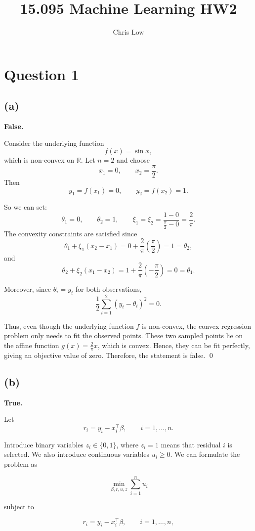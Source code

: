 \documentclass{article}
\title{15.095 Machine Learning HW2}
\author{Chris Low}
\date{} %
\begin{document}
\maketitle

\section*{Question 1}

\subsection*{(a)}
\textbf{False.}

Consider the underlying function
\[
f(x) = \sin x,
\]
which is non-convex on $\mathbb{R}$. Let $n=2$ and choose
\[
x_1 = 0, \qquad x_2 = \frac{\pi}{2}.
\]
Then
\[
y_1 = f(x_1) = 0, \qquad y_2 = f(x_2) = 1.
\]

So we can set: 
\[
\theta_1 = 0, \qquad \theta_2 = 1,
\qquad
\xi_1 = \xi_2 = \frac{1-0}{\frac{\pi}{2}-0} = \frac{2}{\pi}.
\]
The convexity constraints are satisfied since
\[
\theta_1 + \xi_1(x_2-x_1)
= 0 + \frac{2}{\pi}\left(\frac{\pi}{2}\right)
= 1
= \theta_2,
\]
and
\[
\theta_2 + \xi_2(x_1-x_2)
= 1 + \frac{2}{\pi}\left(-\frac{\pi}{2}\right)
= 0
= \theta_1.
\]

Moreover, since $\theta_i = y_i$ for both observations,
\[
\frac{1}{2}\sum_{i=1}^2 (y_i-\theta_i)^2 = 0.
\]

Thus, even though the underlying function $f$ is non-convex, the convex
regression problem only needs to fit the observed points. These two
sampled points lie on the affine function $g(x)=\frac{2}{\pi}x$, which
is convex. Hence, they can be fit perfectly, giving an objective value
of zero. Therefore, the statement is false. \qed

\newpage
\subsection*{(b)}
\textbf{True.}

Let
\[
r_i = y_i - x_i^\top \beta, \qquad i=1,\ldots,n.
\]

Introduce binary variables $z_i \in \{0,1\}$, where $z_i=1$ means
that residual $i$ is selected. We also introduce continuous variables
$u_i \geq 0$. We can formulate the problem as

\[
\min_{\beta,r,u,z} \sum_{i=1}^n u_i
\]

subject to

\[
r_i = y_i - x_i^\top \beta,
\qquad i=1,\ldots,n,
\]
\end{document}

